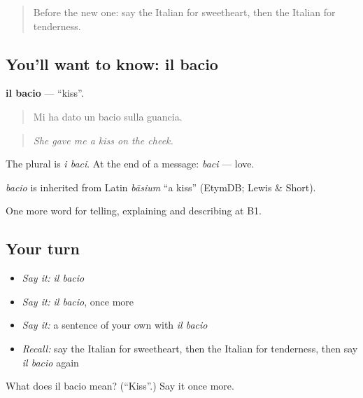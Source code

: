 \label{lesson:IT-C491-bacio}



\begin{quote}
Before the new one: say the Italian for sweetheart, then the Italian for tenderness.
\end{quote}

\subsection*{You'll want to know: il bacio}
\textbf{il bacio} — \textquotedblleft{}kiss\textquotedblright{}.

\begin{quote}
Mi ha dato un bacio sulla guancia.
\end{quote}

\begin{quote}
\emph{She gave me a kiss on the cheek.}
\end{quote}

The plural is \emph{i baci}. At the end of a message: \emph{baci} — love.

\begin{cousinweb}
\emph{bacio} is inherited from Latin \emph{bāsium} \textquotedblleft{}a kiss\textquotedblright{} (EtymDB; Lewis \& Short).
\end{cousinweb}

\begin{grammarlens}[title={What you've built}]
One more word for telling, explaining and describing at B1.
\end{grammarlens}

\subsection*{Your turn}
\begin{itemize}
\raggedright
  \item \emph{Say it:} \emph{il bacio}
  \item \emph{Say it:} \emph{il bacio}, once more
  \item \emph{Say it:} a sentence of your own with \emph{il bacio}
  \item \emph{Recall:} say the Italian for sweetheart, then the Italian for tenderness, then say \emph{il bacio} again
\end{itemize}

\begin{tcolorbox}[breakable,colback=teal!4,colframe=teal!35!black,title={Before you move on}]
What does il bacio mean? (\textquotedblleft{}Kiss\textquotedblright{}.) Say it once more.
\end{tcolorbox}
